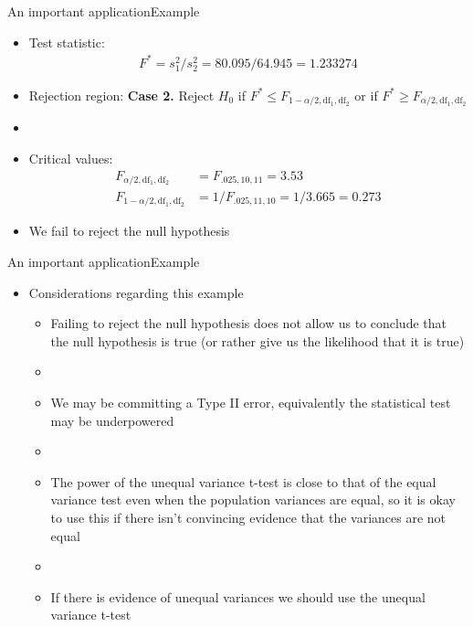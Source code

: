 \documentclass[xcolor=dvipsnames]{beamer}
\begin{document}
\begin{frame}{An important application}{Example}
	\begin{itemize}
		\item Test statistic:
		\begin{gather*}
		F^* = s_1^2 /s_2^2 =  80.095 / 64.945 = 1.233274
		\end{gather*}
		\item Rejection region: \textbf{Case 2.} Reject $H_0$ if $F^* \leq F_{1-\alpha / 2, \text{df}_1,\text{df}_2}$ or if $F^* \geq F_{\alpha / 2, \text{df}_1,\text{df}_2} $
		\item[]
		\item Critical values:
		\begin{align*}
			F_{\alpha/2, \text{df}_1,\text{df}_2} &= F_{.025, 10, 11} = 3.53 \\
			F_{1-\alpha/2, \text{df}_1,\text{df}_2} &= 1 / F_{.025, 11, 10} = 1/3.665 = 0.273
		\end{align*}
		\item We fail to reject the null hypothesis
	\end{itemize}
\end{frame}

\begin{frame}{An important application}{Example}
	\begin{itemize}
		\item Considerations regarding this example
		\begin{itemize}
			\item Failing to reject the null hypothesis does not allow us to conclude that the null hypothesis is true (or rather give us the likelihood that it is true)
			\item[]
			\item We may be committing a Type II error, equivalently the statistical test may be underpowered
			\item[]
			\item The power of the unequal variance t-test is close to that of the equal variance test even when the population variances are equal, so it is okay to use this if there isn't convincing evidence that the variances are not equal
			\item[]
			\item If there is evidence of unequal variances we should use the unequal variance t-test
		\end{itemize}
	\end{itemize}
\end{frame}
\end{document}
